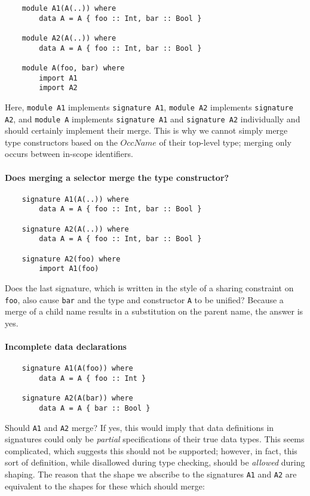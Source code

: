\documentclass{article}
\begin{document}
\begin{verbatim}
    module A1(A(..)) where
        data A = A { foo :: Int, bar :: Bool }

    module A2(A(..)) where
        data A = A { foo :: Int, bar :: Bool }

    module A(foo, bar) where
        import A1
        import A2
\end{verbatim}

Here, \verb|module A1| implements \verb|signature A1|, \verb|module A2| implements \verb|signature A2|,
and \verb|module A| implements \verb|signature A1| and \verb|signature A2| individually
and should certainly implement their merge.  This is why we cannot simply
merge type constructors based on the $OccName$ of their top-level type;
merging only occurs between in-scope identifiers.

\paragraph{Does merging a selector merge the type constructor?}

\begin{verbatim}
    signature A1(A(..)) where
        data A = A { foo :: Int, bar :: Bool }

    signature A2(A(..)) where
        data A = A { foo :: Int, bar :: Bool }

    signature A2(foo) where
        import A1(foo)
\end{verbatim}
%
Does the last signature, which is written in the style of a sharing constraint on \verb|foo|,
also cause \verb|bar| and the type and constructor \verb|A| to be unified?
Because a merge of a child name results in a substitution on the parent name,
the answer is yes.

\paragraph{Incomplete data declarations}

\begin{verbatim}
    signature A1(A(foo)) where
        data A = A { foo :: Int }

    signature A2(A(bar)) where
        data A = A { bar :: Bool }
\end{verbatim}
%
Should \verb|A1| and \verb|A2| merge?  If yes, this would imply
that data definitions in signatures could only be \emph{partial}
specifications of their true data types.  This seems complicated,
which suggests this should not be supported; however, in fact,
this sort of definition, while disallowed during type checking,
should be \emph{allowed} during shaping. The reason that the
shape we abscribe to the signatures \verb|A1| and \verb|A2| are
equivalent to the shapes for these which should merge:
\end{document}
